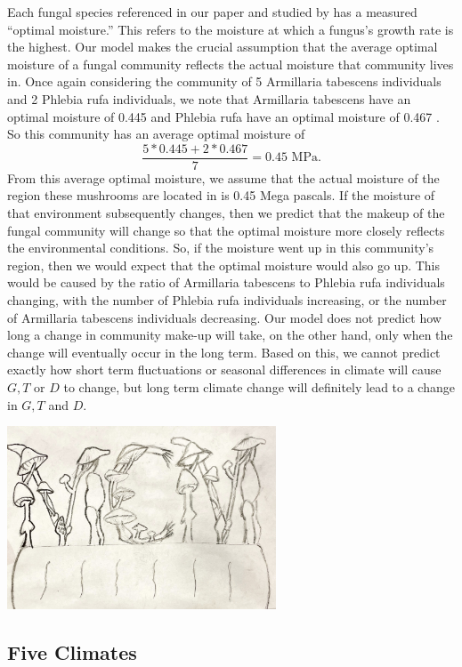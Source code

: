 \documentclass[12pt]{article}
\begin{document}
Each fungal species referenced in our paper and studied by \cite{source25} has a measured ``optimal moisture.'' This refers to the moisture at which a fungus's growth rate is the highest. Our model makes the crucial assumption that the average optimal moisture of a fungal community reflects the actual moisture that community lives in. Once again considering the community of 5  Armillaria tabescens individuals and 2 Phlebia rufa individuals, we note that Armillaria tabescens have an optimal moisture of 0.445 and Phlebia rufa have an optimal moisture of 0.467 \cite{source25}. So this community has an average optimal moisture of
\[
\frac{5* 0.445+ 2*0.467}{7} = 0.45 \textrm{ MPa}.
\]
From this average optimal moisture, we assume that the actual moisture of the region these mushrooms are located in is 0.45 Mega pascals. If the moisture of that environment subsequently changes, then we predict that the makeup of the fungal community will change so that the optimal moisture more closely reflects the environmental conditions. So, if the moisture went up in this community's region, then we would expect that the optimal moisture would also go up. This would be caused by the ratio of Armillaria tabescens to Phlebia rufa individuals changing, with the number of Phlebia rufa individuals increasing, or the number of Armillaria tabescens individuals decreasing. Our model does not predict how long a change in community make-up will take, on the other hand, only when the change will eventually occur in the long term. Based on this, we cannot predict exactly how short term fluctuations or seasonal differences in climate will cause $G,T$ or $D$ to change, but long term climate change will definitely lead to a change in $G,T$ and $D.$

\begin{center}
\includegraphics[width=8cm]{tuanmcm.jpg}
\end{center}

\subsection{Five Climates}
\end{document}
